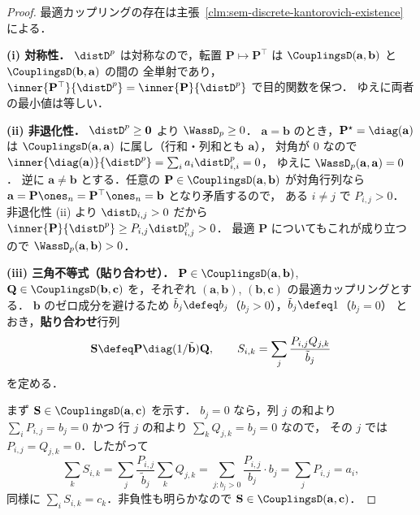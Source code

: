 \begin{proof}
  最適カップリングの存在は主張~\ref{clm:sem-discrete-kantorovich-existence} による．

  \textbf{(i) 対称性．}
  $\distD^p$ は対称なので，転置 $\mathbf{P} \mapsto \mathbf{P}^\top$ は
  $\CouplingsD(\mathbf{a}, \mathbf{b})$ と $\CouplingsD(\mathbf{b}, \mathbf{a})$ の間の
  全単射であり，$\inner{\mathbf{P}^\top}{\distD^p}
  = \inner{\mathbf{P}}{\distD^p}$ で目的関数を保つ．
  ゆえに両者の最小値は等しい．

  \textbf{(ii) 非退化性．}
  $\distD^p \geq \mathbf{0}$ より $\WassD_p \geq 0$．
  $\mathbf{a} = \mathbf{b}$ のとき，$\mathbf{P}^\star = \diag(\mathbf{a})$ は
  $\CouplingsD(\mathbf{a}, \mathbf{a})$ に属し（行和・列和とも $\mathbf{a}$），
  対角が $0$ なので
  $\inner{\diag(\mathbf{a})}{\distD^p} = \sum_i a_i \distD_{i,i}^p = 0$，
  ゆえに $\WassD_p(\mathbf{a}, \mathbf{a}) = 0$．
  逆に $\mathbf{a} \neq \mathbf{b}$ とする．任意の
  $\mathbf{P} \in \CouplingsD(\mathbf{a}, \mathbf{b})$ が対角行列なら
  $\mathbf{a} = \mathbf{P}\ones_n = \mathbf{P}^\top\ones_n = \mathbf{b}$ となり矛盾するので，
  ある $i \neq j$ で $P_{i,j} > 0$．
  非退化性 (ii) より $\distD_{i,j} > 0$ だから
  $\inner{\mathbf{P}}{\distD^p} \geq P_{i,j}\distD_{i,j}^p > 0$．
  最適 $\mathbf{P}$ についてもこれが成り立つので
  $\WassD_p(\mathbf{a}, \mathbf{b}) > 0$．

  \textbf{(iii) 三角不等式（貼り合わせ）．}
  $\mathbf{P} \in \CouplingsD(\mathbf{a}, \mathbf{b})$,
  $\mathbf{Q} \in \CouplingsD(\mathbf{b}, \mathbf{c})$ を，それぞれ
  $(\mathbf{a},\mathbf{b})$, $(\mathbf{b},\mathbf{c})$ の最適カップリングとする．
  $\mathbf{b}$ のゼロ成分を避けるため
  $\tilde{b}_j \defeq b_j$（$b_j > 0$），$\tilde{b}_j \defeq 1$（$b_j = 0$）
  とおき，\textbf{貼り合わせ}行列
  \[
    \mathbf{S} \defeq \mathbf{P}\diag(1/\tilde{\mathbf{b}})\mathbf{Q},
    \qquad
    S_{i,k} = \sum_j \frac{P_{i,j} Q_{j,k}}{\tilde{b}_j}
  \]
  を定める．

  まず $\mathbf{S} \in \CouplingsD(\mathbf{a}, \mathbf{c})$ を示す．
  $b_j = 0$ なら，列 $j$ の和より $\sum_i P_{i,j} = b_j = 0$ かつ
  行 $j$ の和より $\sum_k Q_{j,k} = b_j = 0$ なので，
  その $j$ では $P_{i,j} = Q_{j,k} = 0$．したがって
  \[
    \sum_k S_{i,k}
    = \sum_j \frac{P_{i,j}}{\tilde{b}_j}\sum_k Q_{j,k}
    = \sum_{j : b_j > 0} \frac{P_{i,j}}{b_j} \cdot b_j
    = \sum_j P_{i,j} = a_i,
  \]
  同様に $\sum_i S_{i,k} = c_k$．非負性も明らかなので
  $\mathbf{S} \in \CouplingsD(\mathbf{a}, \mathbf{c})$．


\end{proof}
